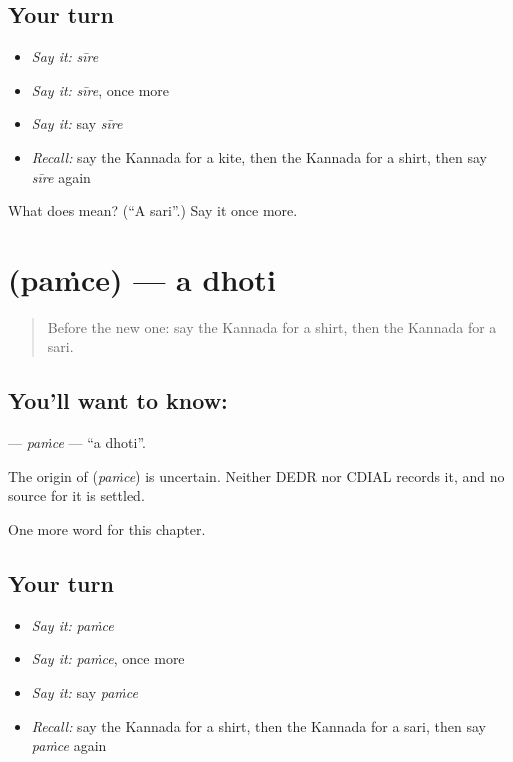 \subsection*{Your turn}
\begin{itemize}
\raggedright
  \item \emph{Say it:} \emph{sīre}
  \item \emph{Say it:} \emph{sīre}, once more
  \item \emph{Say it:} say \emph{sīre}
  \item \emph{Recall:} say the Kannada for a kite, then the Kannada for a shirt, then say \emph{sīre} again
\end{itemize}

\begin{tcolorbox}[breakable,colback=teal!4,colframe=teal!35!black,title={Before you move on}]
What does  mean? (\textquotedblleft{}A sari\textquotedblright{}.) Say it once more.
\end{tcolorbox}
\section[\texorpdfstring{\kn{ಪಂಚೆ} (paṁce)}{ಪಂಚೆ (paṁce)}]{ (paṁce) — a dhoti}

\label{lesson:KA-C120-pamce}



\begin{quote}
Before the new one: say the Kannada for a shirt, then the Kannada for a sari.
\end{quote}

\subsection*{You'll want to know: }
\textbf{} — \emph{paṁce} — \textquotedblleft{}a dhoti\textquotedblright{}.

\begin{cousinweb}
The origin of \textbf{} (\emph{paṁce}) is uncertain. Neither DEDR nor CDIAL records it, and no source for it is settled.
\end{cousinweb}

\begin{grammarlens}[title={What you've built}]
One more word for this chapter.
\end{grammarlens}

\subsection*{Your turn}
\begin{itemize}
\raggedright
  \item \emph{Say it:} \emph{paṁce}
  \item \emph{Say it:} \emph{paṁce}, once more
  \item \emph{Say it:} say \emph{paṁce}
  \item \emph{Recall:} say the Kannada for a shirt, then the Kannada for a sari, then say \emph{paṁce} again
\end{itemize}

